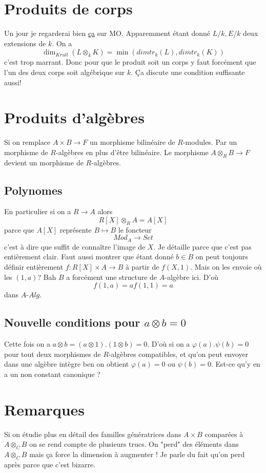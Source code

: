 \documentclass[a4paper,12pt]{book}
\theoremstyle{plain}
\theoremstyle{definition}
\theoremstyle{remark}
\begin{document}
\section{Produits de corps}
Un jour je regarderai bien  
\href{https://mathoverflow.net/questions/82083/when-is-the-tensor-product-of-two-fields-a-field}{ça} sur MO.
Apparemment étant donné $L/k, E/k$ deux extensions de $k$. On a
\[\dim_{Krull}(L\otimes_k K)=\min(dimtr_k(L),dimtr_k(K))\]
c'est trop marrant. Donc pour que le produit soit un corps
y faut forcément que l'un des deux corps soit algébrique sur $k$.
Ça discute une condition suffisante aussi!

\section{Produits d'algèbres}
Si on remplace $A\times B\to F$ un morphisme bilinéaire de 
$R$-modules. Par un morphisme de $R$-algèbres en plus d'être 
bilinéaire. Le morphisme $A\otimes_R B\to F$ devient un morphisme
de $R$-algèbres.
\subsection{Polynomes}
En particulier si on a $R\to A$ alors
\[R[X]\otimes_R A=A[X]\]
parce que $A[X]$ représente $B\mapsto B$ le foncteur 
\[Mod_A\to Set\]
c'est à dire que suffit de connaître l'image de $X$. 
Je détaille parce que c'est pas entièrement clair.
Faut aussi montrer que étant donné $b\in B$ on peut
toujours définir entièrement $f\colon R[X]\times A\to B$ 
à partir de $f(X,1)$. Mais on les envoie où les
$(1,a)$? Bah $B$ a forcément une structure de $A$-algèbre
ici. D'où 
\[f(1,a)=af(1,1)=a\]
dans $A$-$Alg$.

\subsection{Nouvelle conditions pour $a\otimes b=0$}
Cette fois on a $a\otimes b=(a\otimes 1).(1\otimes b)=0$. D'où
si on a $\varphi(a).\psi(b)=0$ pour tout deux morphismes de
$R$-algèbres compatibles, et qu'on peut envoyer dans une algèbre
intègre ben on obtient $\varphi(a)=0$ ou $\psi(b)=0$. Est-ce 
qu'y en a un non constant canonique ?

\section{Remarques}
Si on étudie plus en détail des familles génératrices dans 
$A\times B$ comparées à $A\otimes_C B$ on se rend compte de 
plusieurs trucs. On "perd" des éléments dans $A\otimes_C B$ mais
ça force la dimension à augmenter ! Je parle du fait qu'on perd
après parce que c'est bizarre.
\end{document}
